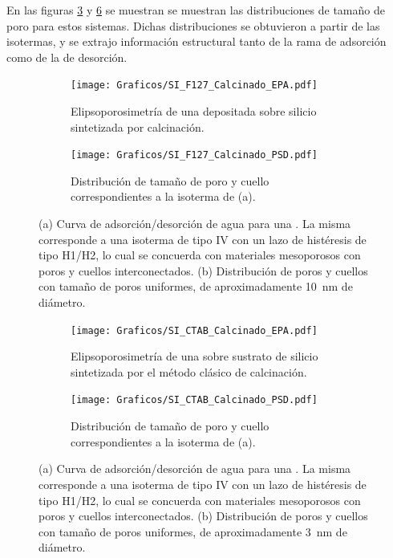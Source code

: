 		 En las figuras \ref{fig:F127_PSD} y \ref{fig:CTAB_PSD} se muestran se muestran las distribuciones de tamaño de poro para estos sistemas. Dichas distribuciones se obtuvieron a partir de las isotermas, y se extrajo información estructural tanto de la rama de adsorción como de la de desorción.


		     	  	\begin{figure}[!ht]
		     	  		\begin{subfigure}[t]{0.495\textwidth}
		     	  		\texttt{[image: Graficos/SI\_F127\_Calcinado\_EPA.pdf]}
						\caption{Elipsoporosimetría de una \pdmF\space depositada sobre silicio sintetizada por calcinación.}
						\label{fig:F127_EPA}
						\end{subfigure}
						\begin{subfigure}[t]{0.495\textwidth}
		     	  		\texttt{[image: Graficos/SI\_F127\_Calcinado\_PSD.pdf]}
						\caption{Distribución de tamaño de poro y cuello correspondientes a la isoterma de (a).}
						\label{fig:F127_PSD}
						\end{subfigure}
						\caption[Elipsoporosimetría para sistemas \pdmF.]{(a) Curva de adsorción/desorción de agua para una \pdmF\space. La misma corresponde a una isoterma de tipo IV con un lazo de histéresis de tipo H1/H2, lo cual se concuerda con materiales mesoporosos con poros y cuellos interconectados. (b) Distribución de poros y cuellos con tamaño de poros uniformes, de aproximadamente \SI{10}{\nm} de diámetro.}
						\end{figure}
					\begin{figure}[!ht]
		     	  		\begin{subfigure}[t]{0.495\textwidth}
		     	  		\texttt{[image: Graficos/SI\_CTAB\_Calcinado\_EPA.pdf]}
						\caption{Elipsoporosimetría de una \pdmF\space sobre sustrato de silicio sintetizada por el método clásico de calcinación.}
						\label{fig:CTAB_EPA}
						\end{subfigure}
						\begin{subfigure}[t]{0.495\textwidth}
		     	  		\texttt{[image: Graficos/SI\_CTAB\_Calcinado\_PSD.pdf]}
						\caption{Distribución de tamaño de poro y cuello correspondientes a la isoterma de (a).}
						\label{fig:CTAB_PSD}
						\end{subfigure}
						\caption[Elipsoporosimetría para sistemas \pdmC.]{(a) Curva de adsorción/desorción de agua para una \pdmC\space . La misma corresponde a una isoterma de tipo IV con un lazo de histéresis de tipo H1/H2, lo cual se concuerda con materiales mesoporosos con poros y cuellos interconectados. (b) Distribución de poros y cuellos con tamaño de poros uniformes, de aproximadamente \SI{3}{\nm} de diámetro.}
						\end{figure}	
		
